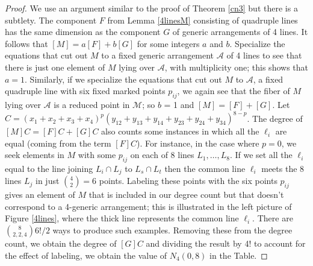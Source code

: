 \documentclass[12pt]{article}
\theoremstyle{plain}
\theoremstyle{definition}
\newcommand{\A}{\mathcal{A}}
\newcommand{\M}{\mathcal{M}}
\begin{document}
\begin{proof}

We use an argument similar to the proof of Theorem \ref{cn3} but there is a subtlety. The component $F$ from Lemma \ref{4linesM} consisting of quadruple lines has the same dimension as the component $G$ of generic arrangements of 4 lines. It follows that $[M] = a[F] + b[G]$ for some integers $a$ and $b$. Specialize the equations that cut out $M$ to a fixed generic arrangement $\A$ of 4 lines to see that there is just one element of $M$ lying over $\A$, with multiplicity one; this shows that $a = 1$. Similarly, if we specialize the equations that cut out $M$ to $\A$, a fixed quadruple line with six fixed marked points $p_{ij}$, we again see that the fiber of $M$ lying over $\A$ is a reduced point in $\M$; so $b$ = 1 and $[M] = [F] + [G]$. Let $C = (x_1+x_2+x_3+x_4)^p(y_{12}+y_{13}+y_{14}+y_{23}+y_{24}+y_{34})^{8-p}$. The degree of $[M]C = [F]C + [G]C$ also counts some instances in which all the $\ell_i$ are equal (coming from the term $[F]C$). For
instance, in the case where $p=0$, we seek elements in $M$ with some
$p_{ij}$ on each of $8$ lines $L_1, \ldots, L_8$. If we set all the
$\ell_i$ equal to the line joining $L_i\cap L_j$ to $L_s \cap L_t$
then the common line $\ell_i$ meets the 8 lines $L_j$ in just
$\binom{4}{2}=6$ points. Labeling these points with the six points
$p_{ij}$ gives an element of $M$ that is included in our degree count
but that doesn't correspond to a 4-generic arrangement; this is
illustrated in the left picture of Figure \ref{4lines}, where the
thick line represents the common line $\ell_i$.  There are
$\binom{8}{2,2,4}6!/2$ ways to produce such examples. Removing these
from the degree count, we obtain the degree of $[G]C$ and dividing the result by 4! to account for the
effect of labeling, we obtain the value of $N_4(0,8)$ in the Table. 


\end{proof}
\end{document}
